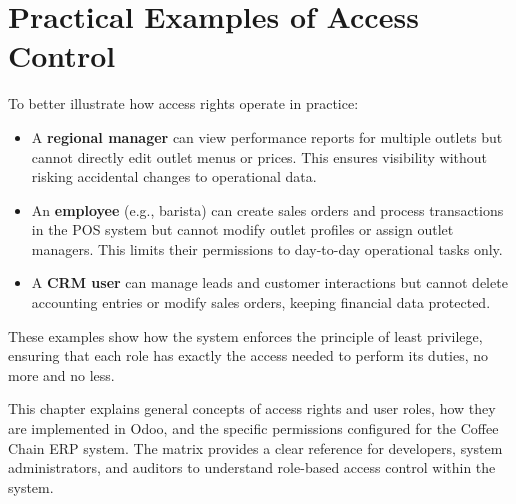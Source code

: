 \section*{Practical Examples of Access Control}

To better illustrate how access rights operate in practice:

\begin{itemize}
    \item A \textbf{regional manager} can view performance reports for multiple outlets but cannot directly edit outlet menus or prices. This ensures visibility without risking accidental changes to operational data.
    \item An \textbf{employee} (e.g., barista) can create sales orders and process transactions in the POS system but cannot modify outlet profiles or assign outlet managers. This limits their permissions to day-to-day operational tasks only.
    \item A \textbf{CRM user} can manage leads and customer interactions but cannot delete accounting entries or modify sales orders, keeping financial data protected.
\end{itemize}

These examples show how the system enforces the principle of least privilege, ensuring that each role has exactly the access needed to perform its duties, no more and no less.


This chapter explains general concepts of access rights and user roles, how they are implemented in Odoo, and the specific permissions configured for the Coffee Chain ERP system. The matrix provides a clear reference for developers, system administrators, and auditors to understand role-based access control within the system.
